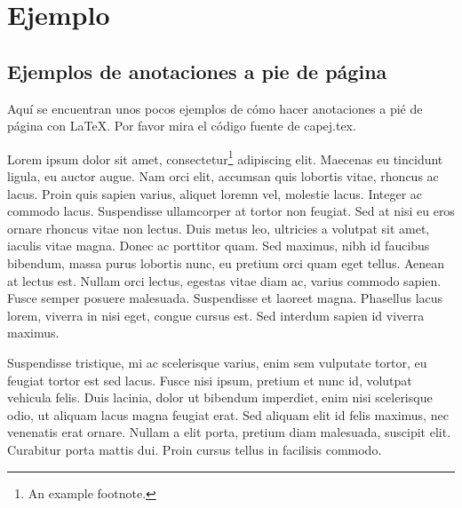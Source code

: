 \chapter{Ejemplo}
\section{Ejemplos de anotaciones a pie de página}

Aquí se encuentran unos pocos ejemplos de cómo hacer anotaciones a pié de página con LaTeX. Por favor mira el código fuente de capej.tex.

Lorem ipsum dolor sit amet, consectetur\footnote{An example footnote.} adipiscing elit. Maecenas eu tincidunt ligula, eu auctor augue. Nam orci elit, accumsan quis lobortis vitae, rhoncus ac lacus. Proin quis sapien varius, aliquet loremn vel, molestie lacus. Integer ac commodo lacus. Suspendisse ullamcorper at tortor non feugiat. Sed at nisi eu eros ornare rhoncus vitae non lectus. Duis metus leo, ultricies a volutpat sit amet, iaculis vitae magna. Donec ac porttitor quam. Sed maximus, nibh id faucibus bibendum, massa purus lobortis nunc, eu pretium orci quam eget tellus. Aenean at lectus est. Nullam orci lectus, egestas vitae diam ac, varius commodo sapien. Fusce semper posuere malesuada. Suspendisse et laoreet magna. Phasellus lacus lorem, viverra in nisi eget, congue cursus est. Sed interdum sapien id viverra maximus.

Suspendisse tristique, mi ac scelerisque varius, enim sem vulputate tortor, eu feugiat tortor est sed lacus. Fusce nisi ipsum, pretium et nunc id, volutpat vehicula felis. Duis lacinia, dolor ut bibendum imperdiet, enim nisi scelerisque odio, ut aliquam lacus magna feugiat erat. Sed aliquam elit id felis maximus, nec venenatis erat ornare. Nullam a elit porta, pretium diam malesuada, suscipit elit. Curabitur porta mattis dui. Proin cursus tellus in facilisis commodo.


